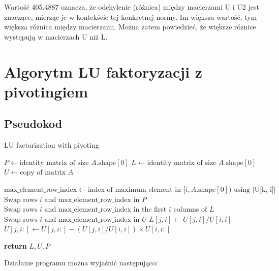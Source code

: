 \documentclass[9pt]{article}
\begin{document}
Wartość 405.4887 oznacza, że odchylenie (różnica) między macierzami U i U2 jest znaczące, mierząc je w kontekście tej konkretnej normy. Im większa wartość, tym większa różnica między macierzami. Można zatem powiedzieć, że większe róznice występują w macierzach U niż L.

\section{Algorytm LU faktoryzacji z pivotingiem}

\subsection{Pseudokod}

\begin{algorithm}
    \caption{LU factorization with pivoting}
    \begin{algorithmic}[1]
    
    \State $P \gets \text{identity matrix of size } A.\text{shape}[0]$
    \State $L \gets \text{identity matrix of size } A.\text{shape}[0]$
    \State $U \gets \text{copy of matrix } A$
    
        \State $\text{max\_element\_row\_index} \gets \text{index of maximum element in } [i, A.\text{shape}[0]) \text{ using } |\text{U[k, i]}|$
            \State $\text{Swap rows } i \text{ and } \text{max\_element\_row\_index}$ in $P$
            \State $\text{Swap rows } i \text{ and } \text{max\_element\_row\_index}$ in the first $i$ columns of $L$
            \State $\text{Swap rows } i \text{ and } \text{max\_element\_row\_index}$ in $U$
        \EndIf
            \State $L[j, i] \gets U[j, i] / U[i, i]$
            \State $U[j, i:] \gets U[j, i:] - (U[j, i] / U[i, i]) \times U[i, i:]$
        \EndFor
    \EndFor
    
    \State \textbf{return} $L, U, P$
    \end{algorithmic}
\end{algorithm}

Działanie programu można wyjaśnić następująco:
\end{document}
